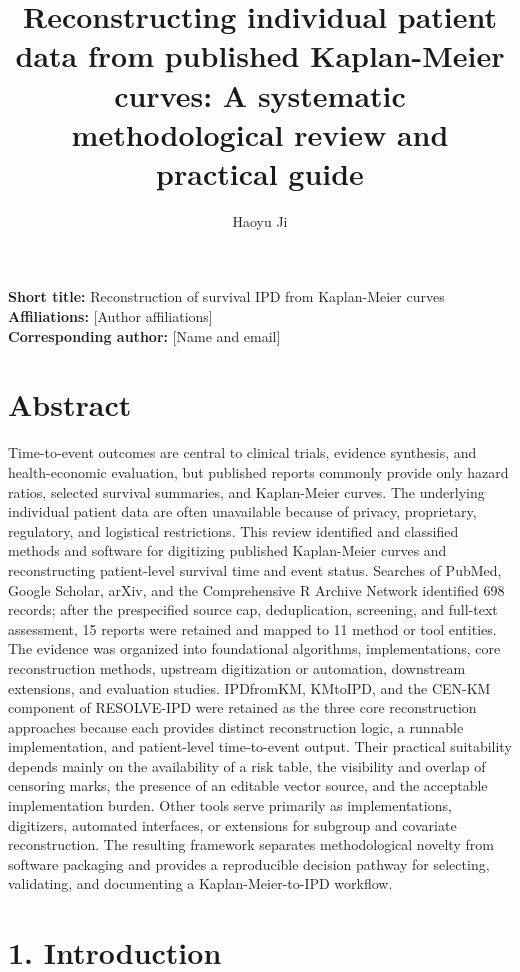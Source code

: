 \documentclass[
  english,
  letterpaper,
  DIV=11,
  numbers=noendperiod]{scrartcl}
\title{Reconstructing individual patient data from published
Kaplan-Meier curves: A systematic methodological review and practical
guide}
\author{Haoyu Ji}
\date{}
\begin{document}
\maketitle


\textbf{Short title:} Reconstruction of survival IPD from Kaplan-Meier
curves\\
\textbf{Affiliations:} {[}Author affiliations{]}\\
\textbf{Corresponding author:} {[}Name and email{]}

\section{Abstract}\label{abstract}

Time-to-event outcomes are central to clinical trials, evidence
synthesis, and health-economic evaluation, but published reports
commonly provide only hazard ratios, selected survival summaries, and
Kaplan-Meier curves. The underlying individual patient data are often
unavailable because of privacy, proprietary, regulatory, and logistical
restrictions. This review identified and classified methods and software
for digitizing published Kaplan-Meier curves and reconstructing
patient-level survival time and event status. Searches of PubMed, Google
Scholar, arXiv, and the Comprehensive R Archive Network identified 698
records; after the prespecified source cap, deduplication, screening,
and full-text assessment, 15 reports were retained and mapped to 11
method or tool entities. The evidence was organized into foundational
algorithms, implementations, core reconstruction methods, upstream
digitization or automation, downstream extensions, and evaluation
studies. IPDfromKM, KMtoIPD, and the CEN-KM component of RESOLVE-IPD
were retained as the three core reconstruction approaches because each
provides distinct reconstruction logic, a runnable implementation, and
patient-level time-to-event output. Their practical suitability depends
mainly on the availability of a risk table, the visibility and overlap
of censoring marks, the presence of an editable vector source, and the
acceptable implementation burden. Other tools serve primarily as
implementations, digitizers, automated interfaces, or extensions for
subgroup and covariate reconstruction. The resulting framework separates
methodological novelty from software packaging and provides a
reproducible decision pathway for selecting, validating, and documenting
a Kaplan-Meier-to-IPD workflow.

\section{1. Introduction}\label{introduction}
\end{document}
